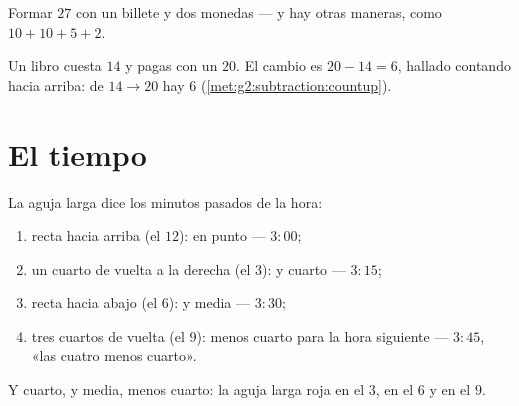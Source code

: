 \begin{omfigure}

{\small Formar $27$ con un billete y dos monedas --- y hay otras
maneras, como $10 + 10 + 5 + 2$.}
\end{omfigure}

\begin{example}[El cambio]\label{ex:g2:measure:change}
Un libro cuesta $14$ y pagas con un $20$. El cambio es $20 - 14 =
6$, hallado contando hacia arriba: de $14 \to 20$ hay $6$
(\cref{met:g2:subtraction:countup}).
\end{example}

\section{El tiempo}

\begin{method}\label{met:g2:measure:clock}
La aguja larga dice los minutos pasados de la hora:
\begin{enumerate}
  \item recta hacia arriba (el $12$): en punto --- $3{:}00$;
  \item un cuarto de vuelta a la derecha (el $3$): y cuarto --- $3{:}15$;
  \item recta hacia abajo (el $6$): y media --- $3{:}30$;
  \item tres cuartos de vuelta (el $9$): menos cuarto para la hora siguiente ---
        $3{:}45$, «las cuatro menos cuarto».
\end{enumerate}
\end{method}

\begin{omfigure}

{\small Y cuarto, y media, menos cuarto: la aguja larga roja en
el $3$, en el $6$ y en el $9$.}
\end{omfigure}

